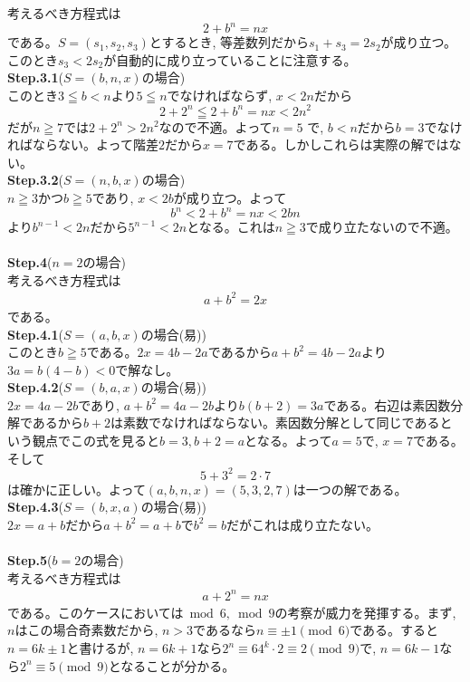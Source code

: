 \documentclass[twocolumn]{jbook}
\theoremstyle{definition}
\renewcommand{\leq}{\leqq}
\renewcommand{\geq}{\geqq}
\newcommand{\step}[2]{{\large \textbf{Step.#1}}(#2)}
\begin{document}
考えるべき方程式は
\[2+b^{n} = nx\]
である。$S=(s_1,s_2,s_3)$とするとき, 等差数列だから$s_1+s_3 = 2s_2$が成り立つ。このとき$s_3 < 2s_2$が自動的に成り立っていることに注意する。\\
\step{3.1}{$S=(b,n,x)$の場合}\\
このとき$3\leq b<n$より$5\leq n$でなければならず, $x<2n$だから
\[2+2^{n} \leq 2+b^{n} = nx < 2n^2\]
だが$n\geq 7$では$2+2^{n} > 2n^2$なので不適。よって$n=5$
で, $b<n$だから$b=3$でなければならない。よって階差$2$だから$x=7$である。しかしこれらは実際の解ではない。\\
\step{3.2}{$S=(n,b,x)$の場合}\\
$n\geq 3$かつ$b\geq 5$であり, $x<2b$が成り立つ。よって
\[b^{n} < 2+b^{n} = nx < 2bn\]
より$b^{n-1} < 2n$だから$5^{n-1} < 2n$となる。これは$n\geq 3$で成り立たないので不適。\\
\\
\step{4}{$n=2$の場合}\\
考えるべき方程式は
\begin{eqnarray}
a+b^{2} = 2x\label{eqnarray:3}
\end{eqnarray}
である。\\
\step{4.1}{$S=(a,b,x)$の場合(易)}\\
このとき$b\geq 5$である。$2x = 4b-2a$であるから$a+b^2 = 4b-2a$より$3a = b(4-b) < 0$で解なし。\\
\step{4.2}{$S=(b,a,x)$の場合(易)}\\
$2x=4a - 2b$であり, $a+b^2 = 4a - 2b$より$b(b+2)=3a$である。右辺は素因数分解であるから$b+2$は素数でなければならない。素因数分解として同じであるという観点でこの式を見ると$b=3, b+2 = a$となる。よって$a=5$で, $x=7$である。そして
\[5 + 3^2 = 2\cdot 7\]
は確かに正しい。よって$(a,b,n,x) = (5,3,2,7)$は一つの解である。\\
\step{4.3}{$S=(b,x,a)$の場合(易)}\\
$2x = a+b$だから$a+b^2 = a+b$で$b^2 = b$だがこれは成り立たない。\\
\\
\step{5}{$b=2$の場合}\\
考えるべき方程式は
\begin{eqnarray}
a+2^{n} = nx\label{eqnarray:2}
\end{eqnarray}
である。このケースにおいては$\bmod{6}, \bmod{9}$の考察が威力を発揮する。まず, $n$はこの場合奇素数だから, $n>3$であるなら$n\equiv \pm 1\pmod{6}$である。すると$n=6k\pm 1$と書けるが, $n=6k+1$なら$2^{n} \equiv 64^{k}\cdot 2 \equiv 2\pmod{9}$で, $n=6k-1$なら$2^{n}\equiv 5\pmod{9}$となることが分かる。\par
\end{document}

